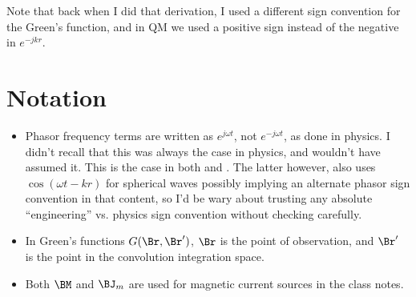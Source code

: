 Note that back when I did that derivation, I used a different sign convention for the Green's function, and in QM we used a positive sign instead of the negative in \( e^{-j k r } \).

\section{Notation}

\begin{itemize}
\item Phasor frequency terms are written as \( e^{j \omega t} \), not \( e^{-j \omega t} \), as done in physics.  I didn't recall that this was always the case in physics, and wouldn't have assumed it.  This is the case in both \citep{jackson1975cew:simpleRadiating} and \citep{griffiths1999introduction:waves}.  The latter however, also uses \( \cos(\omega t - k r) \) for spherical waves possibly implying an alternate phasor sign convention in that content, so I'd be wary about trusting any absolute ``engineering'' vs. physics sign convention without checking carefully.
\item In Green's functions \( G(\Br, \Br') \), \( \Br \) is the point of observation, and \( \Br' \) is the point in the convolution integration space.
\item Both \( \BM \) and \( \BJ_m \) are used for magnetic current sources in the class notes.
\end{itemize}

%
%

